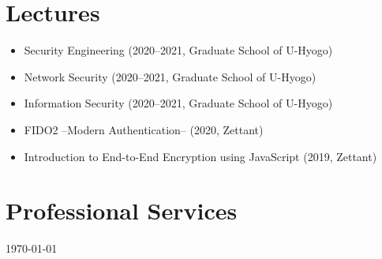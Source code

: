 \section*{Lectures}
\begin{itemize}
 \item Security Engineering (2020--2021, Graduate School of U-Hyogo)
 \item Network Security (2020--2021, Graduate School of U-Hyogo)
 \item Information Security (2020--2021, Graduate School of U-Hyogo)
 \item FIDO2 –Modern Authentication– (2020, Zettant)
 \item Introduction to End-to-End Encryption using JavaScript (2019, Zettant)
\end{itemize}

\section*{Professional Services}


\bigskip

\begin{center}
  \begin{footnotesize}
   \today \\
    \href{\footerlink}{\texttt{\footerlink}}
  \end{footnotesize}
\end{center}
